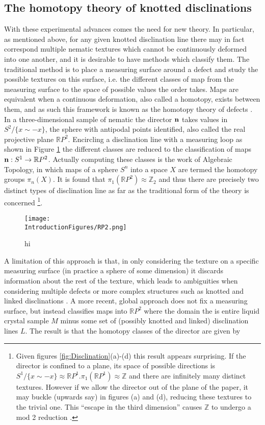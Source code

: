 \subsection{The homotopy theory of knotted disclinations}
With these experimental advances comes the need for new theory. In particular, as mentioned above, for any given knotted disclination line there may in fact correspond multiple nematic textures which cannot be continuously deformed into one another, and it is desirable to have methods which classify them. The traditional method is to place a measuring surface around a defect and study the possible textures on this surface, i.e. the different classes of map from the measuring surface to the space of possible values the order takes. Maps are equivalent when a continuous deformation, also called a homotopy, exists between them, and as such this framework is known as the homotopy theory of defects \cite{Mermin,Alexander}. In a three-dimensional sample of nematic the director $\bf n$ takes values in $S^2/\{x\sim-x\}$, the sphere with antipodal points identified, also called the real projective plane $\mathbb{R}P^2$. Encircling a disclination line with a measuring loop as shown in Figure \ref{fig:RP2} the different classes are reduced to the classification of maps ${\bf n}:S^1 \rightarrow \mathbb{R}P^2$. Actually computing these classes is the work of Algebraic Topology, in which maps of a sphere $S^n$ into a space $X$ are termed the homotopy groups $\pi_n(X)$. It is found that $\pi_1(\mathbb{R}P^2) \approx \mathbb{Z}_2$ and thus there are precisely two distinct types of disclination line as far as the traditional form of the theory is concerned \footnote{Given figures \ref{fig:Disclination}(a)-(d) this result appears surprising. If the director is confined to a plane, its space of possible directions is $S^1/\{x\sim-x\} \approx \mathbb{R}P^1$.$\pi_1(\mathbb{R}P^1) \approx \mathbb{Z}$ and there are infinitely many distinct textures. However if we allow the director out of the plane of the paper, it may buckle (upwards say) in figures (a) and (d), reducing these textures to the trivial one. This ``escape in the third dimension'' causes $\mathbb{Z}$ to undergo a mod 2 reduction \cite{Machon}. }.
\begin{figure}[htbp]
\centering
\texttt{[image: \\IntroductionFigures/RP2.png]}
\caption{hi }
\label{fig:RP2}
\end{figure}
A limitation of this approach is that, in only considering the texture on a specific measuring surface (in practice a sphere of some dimension) it discards information about the rest of the texture, which leads to ambiguities when considering multiple defects or more complex structures such as knotted and linked disclinations \cite{Alexander,Machon}. A more recent, global approach \cite{Machon} does not fix a measuring surface, but instead classifies maps into $\mathbb{R}P^2$ where the domain the is entire liquid crystal sample $M$ minus some set of (possibly knotted and linked) disclination lines $L$. The result is that the homotopy classes of the director are given by
